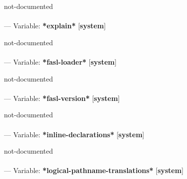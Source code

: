 \begin{adjustwidth}{5em}{5em}
not-documented
\end{adjustwidth}

\paragraph{}
\label{SYSTEM:*EXPLAIN*}
--- Variable: \textbf{*explain*} [\textbf{system}] \textit{}

\begin{adjustwidth}{5em}{5em}
not-documented
\end{adjustwidth}

\paragraph{}
\label{SYSTEM:*FASL-LOADER*}
--- Variable: \textbf{*fasl-loader*} [\textbf{system}] \textit{}

\begin{adjustwidth}{5em}{5em}
not-documented
\end{adjustwidth}

\paragraph{}
\label{SYSTEM:*FASL-VERSION*}
--- Variable: \textbf{*fasl-version*} [\textbf{system}] \textit{}

\begin{adjustwidth}{5em}{5em}
not-documented
\end{adjustwidth}

\paragraph{}
\label{SYSTEM:*INLINE-DECLARATIONS*}
--- Variable: \textbf{*inline-declarations*} [\textbf{system}] \textit{}

\begin{adjustwidth}{5em}{5em}
not-documented
\end{adjustwidth}

\paragraph{}
\label{SYSTEM:*LOGICAL-PATHNAME-TRANSLATIONS*}
--- Variable: \textbf{*logical-pathname-translations*} [\textbf{system}] \textit{}

